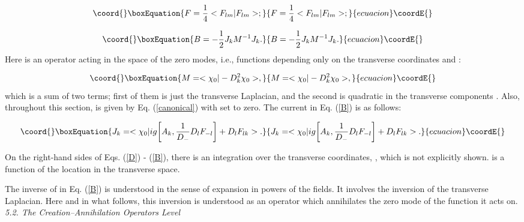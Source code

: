 \documentclass[a4paper,12pt]{article}
\begin{document}
\begin{equation}\coord{}\boxEquation{
\label{F}
F = \frac{1}{4} <F_{lm}|F_{lm}>;
}{
F = \frac{1}{4} <F_{lm}|F_{lm}>;
}{ecuacion}\coordE{}\end{equation}

\begin{equation}\coord{}\boxEquation{
\label{B}
B = -\frac{1}{2} J_k M^{-1} J_k.
}{
B = -\frac{1}{2} J_k M^{-1} J_k.
}{ecuacion}\coordE{}\end{equation}
Here \coordHE{} is an operator acting in the space of the zero modes, i.e.,
functions depending only on the transverse coordinates and \coordHE{}:

\begin{equation}\coord{}\boxEquation{
\label{M}
M = <\chi_0|-D_k^2\chi_0>,
}{
M = <\chi_0|-D_k^2\chi_0>,
}{ecuacion}\coordE{}\end{equation}
which is a sum of two terms; 
first of them is just the transverse 
Laplacian, and the second is quadratic in the transverse components \coordHE{}.
Also, throughout this section, \coordHE{} is given by
Eq. (\ref{canonical}) with \coordHE{} set to zero.
The current \coordHE{} in Eq. (\ref{B}) is as follows:

\begin{equation}\coord{}\boxEquation{
\label{J}
J_k = <\chi_0|ig \bigg[ A_k,\frac{1}{D_-} D_lF_{-l} \bigg] 
+ D_lF_{lk}>.
}{
J_k = <\chi_0|ig \bigg[ A_k,\frac{1}{D_-} D_lF_{-l} \bigg] 
+ D_lF_{lk}>.
}{ecuacion}\coordE{}\end{equation} 

On the right-hand sides of Eqs. (\ref{D}) - (\ref{B}), 
there is an integration over the transverse coordinates, 
\coordHE{}, 
which is not explicitly shown. \coordHE{} is a function of the
location in the transverse space.

The inverse of \coordHE{} in Eq. (\ref{B}) is understood in the sense of 
expansion in powers of the fields. It involves the inversion of the 
transverse Laplacian. Here and in what follows, this inversion is 
understood as an operator which annihilates the zero mode of
the function it acts on. \\


{\it 5.2. The Creation--Annihilation Operators Level }\\
\end{document}
